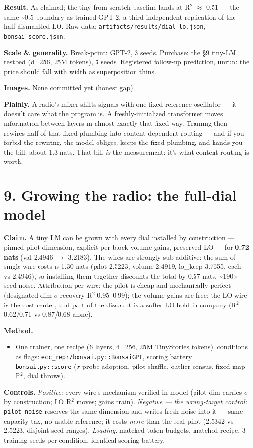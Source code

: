 \documentclass[10pt]{article}
\begin{document}
\textbf{Result.} As claimed; the tiny from-scratch baseline lands at R$^{2}$ $\approx$ 0.51 --- the same \textasciitilde{}0.5 boundary
as trained GPT-2, a third independent replication of the half-dismantled LO. Raw data:
\texttt{artifacts/results/dial\_lo.json}, \texttt{bonsai\_score.json}.

\textbf{Scale \& generality.} Break-point: GPT-2, 3 seeds. Purchase: the §9 tiny-LM testbed (d=256, 25M
tokens), 3 seeds. Registered follow-up prediction, unrun: the price should fall with width as
superposition thins.

\textbf{Images.} None committed yet (honest gap).

\textbf{Plainly.} A radio's mixer shifts signals with one fixed reference oscillator --- it doesn't care
what the program is. A freshly-initialized transformer moves information between layers in almost
exactly that fixed way. Training then rewires half of that fixed plumbing into content-dependent
routing --- and if you forbid the rewiring, the model obliges, keeps the fixed plumbing, and hands
you the bill: about 1.3 nats. That bill \emph{is} the measurement: it's what content-routing is worth.

\section{9. Growing the radio: the full-dial model}

\textbf{Claim.} A tiny LM can be grown with every dial installed by construction --- pinned pilot
dimension, explicit per-block volume gains, preserved LO --- for \textbf{0.72 nats} (val 2.4946 $\to$ 3.2183).
The wires are strongly sub-additive: the sum of single-wire costs is 1.30 nats (pilot 2.5223,
volume 2.4919, lo\_keep 3.7655, each vs 2.4946), so installing them together discounts the total by
0.57 nats, \textasciitilde{}190$\times$ seed noise. Attribution per wire: the pilot is cheap and mechanically perfect
(designated-dim $\sigma$-recovery R$^{2}$ 0.95--0.99); the volume gains are free; the LO wire is the cost
center; and part of the discount is a softer LO hold in company (R$^{2}$ 0.62/0.71 vs 0.87/0.68 alone).

\textbf{Method.}
\begin{itemize}\setlength\itemsep{1pt}
\item One trainer, one recipe (6 layers, d=256, 25M TinyStories tokens), conditions as flags: \texttt{ecc\_repr/bonsai.py::BonsaiGPT}, scoring battery \texttt{bonsai.py::score} ($\sigma$-probe adoption, pilot shuffle, outlier census, fixed-map R$^{2}$, dial throws).
\end{itemize}
\textbf{Controls.} \emph{Positive:} every wire's mechanism verified in-model (pilot dim carries $\sigma$ by
construction; LO R$^{2}$ moves; gains train). \emph{Negative --- the wrong-target control:} \texttt{pilot\_noise}
reserves the same dimension and writes fresh noise into it --- same capacity tax, no usable
reference; it costs \emph{more} than the real pilot (2.5342 vs 2.5223, disjoint seed ranges).
\emph{Loading:} matched token budgets, matched recipe, 3 training seeds per condition, identical
scoring battery.
\end{document}
